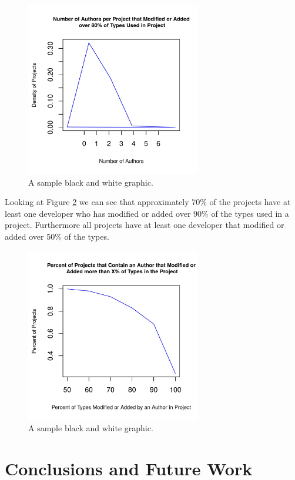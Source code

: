 \documentclass{sig-alternate-05-2015}
\begin{document}
\begin{figure}[ht]
\centering
\includegraphics[height=3in, width=3in]{../lib_stats_Threshold80_dist}
\caption{A sample black and white graphic.}
\label{lib_stats_Threshold80_dist}
\end{figure}

Looking at Figure \ref{lib_stats_count_authors_percent_per_project} we can see that approximately 70\% of the projects have at least one developer who has modified or added over 90\% of the types used in a project. Furthermore all projects have at least one developer that modified or added over 50\% of the types.


\begin{figure}[ht]
\centering
\includegraphics[height=3in, width=3in]{../lib_stats_count_authors_percent_per_project}
\caption{A sample black and white graphic.}
\label{lib_stats_count_authors_percent_per_project}
\end{figure}

\section{Conclusions and Future Work}
\end{document}
